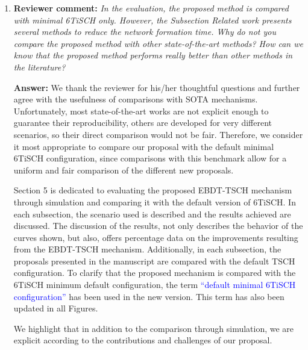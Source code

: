 \documentclass{article}
\newcommand{\textchange}[1]{\textcolor{blue}{#1}}
\begin{document}
\begin{enumerate}

\item \textbf{Reviewer comment:} \textit{In the evaluation, the proposed method is compared with minimal 6TiSCH only. However, the Subsection Related work presents several methods to reduce the network formation time. Why do not you compare the proposed method with other state-of-the-art methods? How can we know that the proposed method performs really better than other methods in the literature?}

\textbf{Answer:} We thank the reviewer for his/her thoughtful questions and further agree with the usefulness of comparisons with SOTA mechanisms. Unfortunately, most state-of-the-art works are not explicit enough to guarantee their reproducibility, others are developed for very different scenarios, so their direct comparison would not be fair. Therefore, we consider it most appropriate to compare our proposal with the default minimal 6TiSCH configuration, since comparisons with this benchmark allow for a uniform and fair comparison of the different new proposals.

Section 5 is dedicated to evaluating the proposed EBDT-TSCH mechanism through simulation and comparing it with the default version of 6TiSCH. In each subsection, the scenario used is described and the results achieved are discussed. The discussion of the results, not only describes the behavior of the curves shown, but also, offers percentage data on the improvements resulting from the EBDT-TSCH mechanism. Additionally, in each subsection, the proposals presented in the manuscript are compared with the default TSCH configuration. To clarify that the proposed mechanism is compared with the 6TiSCH minimum default configuration, the term \textchange{``default minimal 6TiSCH configuration''} has been used in the new version. This term has also been updated in all Figures. 

We highlight that in addition to the comparison through simulation, we are explicit according to the contributions and challenges of our proposal.


\end{enumerate}
\end{document}
